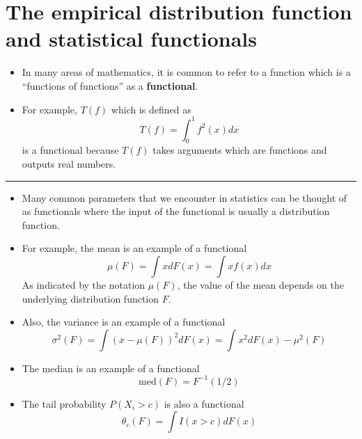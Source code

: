 \documentclass[]{book}
\begin{document}
\hypertarget{the-empirical-distribution-function-and-statistical-functionals}{%
\section{The empirical distribution function and statistical functionals}\label{the-empirical-distribution-function-and-statistical-functionals}}

\begin{itemize}
\item
  In many areas of mathematics, it is common to refer to a function
  which is a ``functions of functions'' as a \textbf{functional}.
\item
  For example, \(T(f)\) which is defined as
  \begin{equation}
  T(f) = \int_{0}^{1} f^{2}(x) dx
  \end{equation}
  is a functional because \(T(f)\) takes arguments which are functions
  and outputs real numbers.
\end{itemize}

\begin{center}\rule{0.5\linewidth}{\linethickness}\end{center}

\begin{itemize}
\item
  Many common parameters that we encounter in statistics can be thought of
  as functionals where the input of the functional is usually a distribution function.
\item
  For example, the mean is an example of a functional
  \begin{equation}
  \mu(F) = \int x dF(x) = \int x f(x) dx \nonumber 
  \end{equation}
  As indicated by the notation \(\mu(F)\), the value of the mean
  depends on the underlying distribution function \(F\).
\item
  Also, the variance is an example of a functional
  \begin{equation}
  \sigma^{2}(F) = \int (x - \mu(F))^{2} dF(x)
  = \int x^{2} dF(x) - \mu^{2}(F) \nonumber
  \end{equation}
\item
  The median is an example of a functional
  \begin{equation}
  \textrm{med}(F) = F^{-1}(1/2) \nonumber
  \end{equation}
\item
  The tail probability \(P(X_{i} > c)\) is also a functional
  \begin{equation}
  \theta_{c}(F) = \int I(x > c) dF(x) \nonumber
  \end{equation}
\end{itemize}
\end{document}
